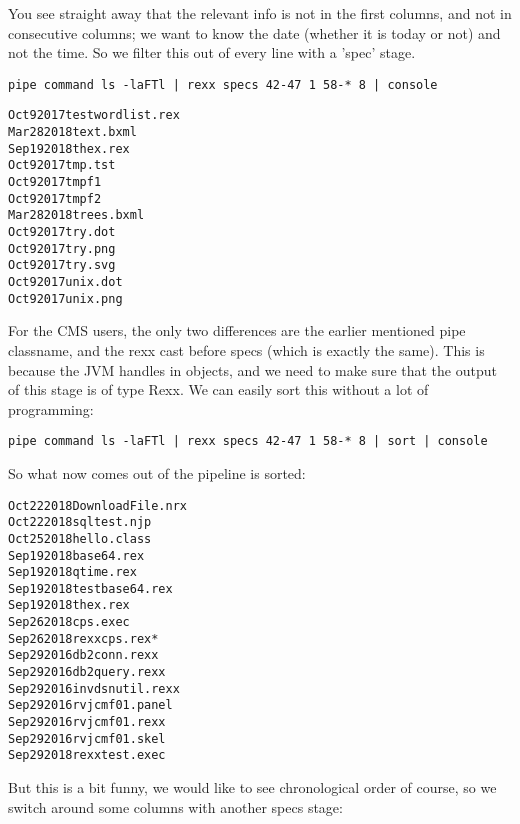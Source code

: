You see straight away that the relevant info is not in the first columns, and not in consecutive columns; we want to know the date (whether it is today or not) and not the time. So we filter this out of every line with a 'spec' stage.
\begin{lstlisting}
pipe command ls -laFTl | rexx specs 42-47 1 58-* 8 | console
\end{lstlisting}
\begin{alltt}
Oct 9 2017 testwordlist.rex
Mar 28 2018 text.bxml
Sep 19 2018 thex.rex
Oct 9 2017 tmp.tst
Oct 9 2017 tmpf1
Oct 9 2017 tmpf2
Mar 28 2018 trees.bxml
Oct 9 2017 try.dot
Oct 9 2017 try.png
Oct 9 2017 try.svg
Oct 9 2017 unix.dot
Oct 9 2017 unix.png
\end{alltt}
For the CMS users, the only two differences are the earlier mentioned pipe classname, and the rexx cast before specs (which is exactly the same). This is because the JVM handles in objects, and we need to make sure that the output of this stage is of type Rexx. 
We can easily sort this without a lot of programming:

\begin{lstlisting}
pipe command ls -laFTl | rexx specs 42-47 1 58-* 8 | sort | console
\end{lstlisting}
So what now comes out of the pipeline is sorted:
\begin{alltt}
Oct 22 2018 DownloadFile.nrx
Oct 22 2018 sqltest.njp
Oct 25 2018 hello.class
Sep 19 2018 base64.rex
Sep 19 2018 qtime.rex
Sep 19 2018 testbase64.rex
Sep 19 2018 thex.rex
Sep 26 2018 cps.exec
Sep 26 2018 rexxcps.rex*
Sep 29 2016 db2conn.rexx
Sep 29 2016 db2query.rexx
Sep 29 2016 invdsnutil.rexx
Sep 29 2016 rvjcmf01.panel
Sep 29 2016 rvjcmf01.rexx
Sep 29 2016 rvjcmf01.skel
Sep 29 2018 rexxtest.exec
\end{alltt}
But this is a bit funny, we would like to see chronological order of course, so we switch around some columns with another specs stage:

